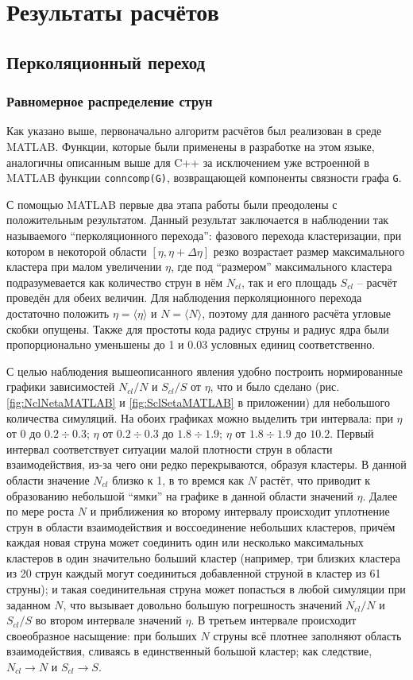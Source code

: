 \section{Результаты расчётов}
\subsection{Перколяционный переход}
\subsubsection{Равномерное распределение струн}
Как указано выше, первоначально алгоритм расчётов был реализован в среде MATLAB. Функции, которые были применены в разработке на этом языке, аналогичны описанным выше для C++ за исключением уже встроенной в MATLAB функции \texttt{conncomp(G)}, возвращающей компоненты связности графа \texttt{G}. 

С помощью MATLAB первые два этапа работы были преодолены с положительным результатом.
Данный результат заключается в наблюдении так называемого ``перколяционного перехода'': фазового перехода кластеризации, при котором в некоторой области $[\eta, \eta + \Delta \eta]$ резко возрастает размер максимального кластера при малом увеличении $\eta$, где под ``размером'' максимального кластера подразумевается как количество струн в нём $N_{cl}$, так и его площадь $S_{cl}$ -- расчёт проведён для обеих величин. 
Для наблюдения перколяционного перехода достаточно положить $\eta = \langle \eta \rangle$ и $N = \langle N \rangle$, поэтому для данного расчёта угловые скобки опущены. Также для простоты кода радиус струны и радиус ядра были пропорционально уменьшены до 1 и 0.03 условных единиц соответственно. 

С целью наблюдения вышеописанного явления удобно построить нормированные графики зависимостей $N_{cl}/N$ и $S_{cl}/S$ от $\eta$, что и было сделано (рис. \ref{fig:NclNetaMATLAB} и \ref{fig:SclSetaMATLAB} в приложении) для небольшого количества симуляций. 
На обоих графиках можно выделить три интервала: при $\eta$ от 0 до $0.2 \div 0.3$; $\eta$ от $0.2 \div 0.3$ до $1.8 \div 1.9$; $\eta$ от $1.8 \div 1.9$ до $10.2$. 
Первый интервал соответствует ситуации малой плотности струн в области взаимодействия, из-за чего они редко перекрываются, образуя кластеры.
В данной области значение $N_{cl}$ близко к 1, в то времся как $N$ растёт, что приводит к образованию небольшой ``ямки'' на графике в данной области значений $\eta$.
Далее по мере роста $N$ и приближения ко второму интервалу происходит уплотнение струн в области взаимодействия и воссоединение небольших кластеров, причём каждая новая струна может соединить один или несколько максимальных кластеров в один значительно больший кластер (например, три близких кластера из 20 струн каждый могут соединиться добавленной струной в кластер из 61 струны); и такая соединительная струна может попасться в любой симуляции при заданном $N$, что вызывает довольно большую погрешность значений $N_{cl}/N$ и $S_{cl}/S$ во втором интервале значений $\eta$. 
В третьем интервале происходит своеобразное насыщение: при больших $N$ струны всё плотнее заполняют область взаимодействия, сливаясь в единственный большой кластер; как следствие, $N_{cl} \rightarrow N$ и $S_{cl} \rightarrow S$.

